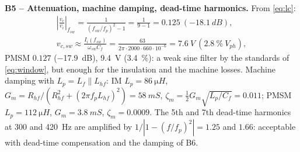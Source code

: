 \documentclass[10pt,a4paper]{scrartcl}
\newcommand{\fsw}{f_{sw}}
\newcommand{\wsw}{\omega_{sw}}
\newcommand{\Lhf}{L_{hf}}
\newcommand{\Rhf}{R_{hf}}
\newcommand{\Cf}{C_{f}}
\newcommand{\Lf}{L_{f}}
\begin{document}
\begin{onehalfspace}
\textbf{B5 -- Attenuation, machine damping, dead-time harmonics.} From \eqref{eq:lc}:
\begin{gather*}
\left|\frac{v_c}{v_i}\right|_{\fsw} = \frac{1}{(\fsw/f_p)^2 - 1} = \frac{1}{9 - 1} = 0.125\ (\SI{-18.1}{dB}),\\
v_{c,sw} \approx \frac{I_i(\fsw)}{\wsw \Cf} = \frac{63}{2\pi \cdot 2000 \cdot 660\cdot 10^{-6}} = \SI{7.6}{V}\ (\SI{2.8}{\percent}\ V_{ph}),
\end{gather*}
PMSM $0.127$ (\SI{-17.9}{dB}), \SI{9.4}{V} (\SI{3.4}{\percent}): a weak sine filter by the standards of \eqref{eq:window}, but enough for the insulation and the machine losses. Machine damping with $L_p = \Lf \parallel \Lhf$: IM $L_p = \SI{86}{\micro H}$, $G_m = \Rhf/(\Rhf^2 + (2\pi f_p\Lhf)^2) = \SI{58}{mS}$, $\zeta_m = \tfrac12 G_m\sqrt{L_p/\Cf} = 0.011$; PMSM $L_p = \SI{112}{\micro H}$, $G_m = \SI{3.8}{mS}$, $\zeta_m = 0.0009$. The 5th and 7th dead-time harmonics at \SI{300}{} and \SI{420}{Hz} are amplified by $1/|1 - (f/f_p)^2| = 1.25$ and $1.66$: acceptable with dead-time compensation and the damping of B6.


\end{onehalfspace}
\end{document}
